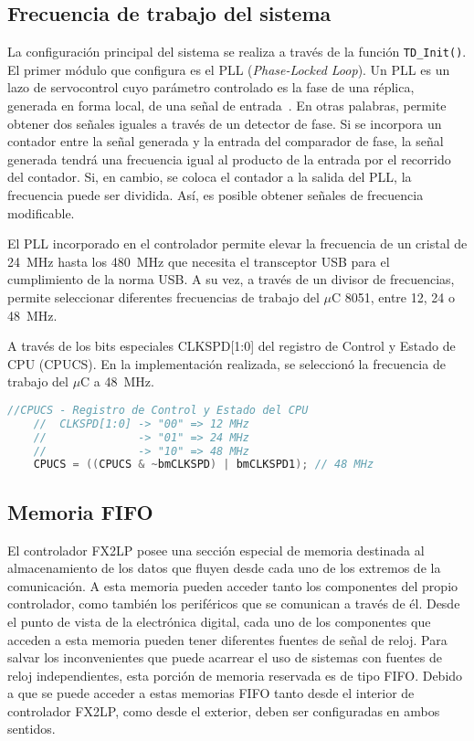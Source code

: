 \subsection{Frecuencia de trabajo del sistema}
	La configuración principal del sistema se realiza a través de la función \verb|TD_Init()|. El primer módulo que configura es el PLL ({\it Phase-Locked Loop}). Un PLL es un lazo de servocontrol cuyo parámetro controlado es la fase de una réplica, generada en forma local, de una señal de entrada~\cite{Sklar2001}. En otras palabras, permite obtener dos señales iguales a través de un detector de fase. Si se incorpora un contador entre la señal generada y la entrada del comparador de fase, la señal generada tendrá una frecuencia igual al producto de la entrada por el recorrido del contador. Si, en cambio, se coloca el contador a la salida del PLL, la frecuencia puede ser dividida. Así, es posible obtener señales de frecuencia modificable.

	El PLL incorporado en el controlador permite elevar la frecuencia de un cristal de \SI{24}{\mega\hertz} hasta los \SI{480}{\mega\hertz} que necesita el transceptor USB para el cumplimiento de la norma USB. A su vez, a través de un divisor de frecuencias, permite seleccionar diferentes frecuencias de trabajo del $\mu$C 8051, entre \si{12}, \si{24} o \SI{48}{\mega\hertz}.
	
	A través de los bits especiales CLKSPD[1:0] del registro de Control y Estado de CPU (CPUCS). En la implementación realizada, se seleccionó la frecuencia de trabajo del $\mu$C a \SI{48}{\mega\hertz}.
	
	\begin{lstlisting}[language=C,backgroundcolor=\color{gray!30}]
	//CPUCS - Registro de Control y Estado del CPU
	//	CLKSPD[1:0] -> "00" => 12 MHz
	//				-> "01" => 24 MHz
	//				-> "10" => 48 MHz
	CPUCS = ((CPUCS & ~bmCLKSPD) | bmCLKSPD1); // 48 MHz
	\end{lstlisting}	

\subsection{Memoria FIFO}
	El controlador FX2LP posee una sección especial de memoria destinada al almacenamiento de los datos que fluyen desde cada uno de los extremos de la comunicación. A esta memoria pueden acceder tanto los componentes del propio controlador, como también los periféricos que se comunican a través de él. Desde el punto de vista de la electrónica digital, cada uno de los componentes que acceden a esta memoria pueden tener diferentes fuentes de señal de reloj. Para salvar los inconvenientes que puede acarrear el uso de sistemas con fuentes de reloj independientes, esta porción de memoria reservada es de tipo FIFO. Debido a que se puede acceder a estas memorias FIFO tanto desde el interior de controlador FX2LP, como desde el exterior, deben ser configuradas en ambos sentidos.
	
